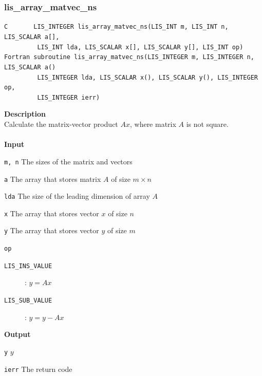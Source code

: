 \documentclass[a4paper]{article}
\newcommand{\namelistlabel}[1]{\mbox{#1}\hfill}
\newenvironment{namelist}[1]{%
\begin{list}{}
  {\let\makelabel\namelistlabel
  \settowidth{\labelwidth}{#1}
  \setlength{\leftmargin}{1.1\labelwidth}}
  }{%
\end{list}}
\begin{document}
\subsubsection{lis\_array\_matvec\_ns}
\begin{screen}
\verb|C       LIS_INTEGER lis_array_matvec_ns(LIS_INT m, LIS_INT n, LIS_SCALAR a[],|\\
\verb|         LIS_INT lda, LIS_SCALAR x[], LIS_SCALAR y[], LIS_INT op)|\\
\verb|Fortran subroutine lis_array_matvec_ns(LIS_INTEGER m, LIS_INTEGER n, LIS_SCALAR a()|\\
\verb|         LIS_INTEGER lda, LIS_SCALAR x(), LIS_SCALAR y(), LIS_INTEGER op,|\\
\verb|         LIS_INTEGER ierr)|
\end{screen}
{\bf Description}\\
\indent
Calculate the matrix-vector product $Ax$, where matrix $A$ is not square.
\\ \\
\noindent
{\bf Input}
\begin{namelist}{XXXXXXXXXXXXXXXXXXXX}
\item[\tt m, n] The sizes of the matrix and vectors  
\item[\tt a] The array that stores matrix $A$ of size $m \times n$
\item[\tt lda] The size of the leading dimension of array $A$
\item[\tt x] The array that stores vector $x$ of size $n$
\item[\tt y] The array that stores vector $y$ of size $m$
\item[\tt op] \begin{description}
\item[\tt LIS\_INS\_VALUE]: $y = Ax$
\item[\tt LIS\_SUB\_VALUE]: $y = y - Ax$
\end{description}
\end{namelist}
{\bf Output}
\begin{namelist}{XXXXXXXXXXXXXXXXXXXX}
\item[\tt y] $y$
\item[\tt ierr] The return code
\end{namelist}

\newpage
\end{document}
